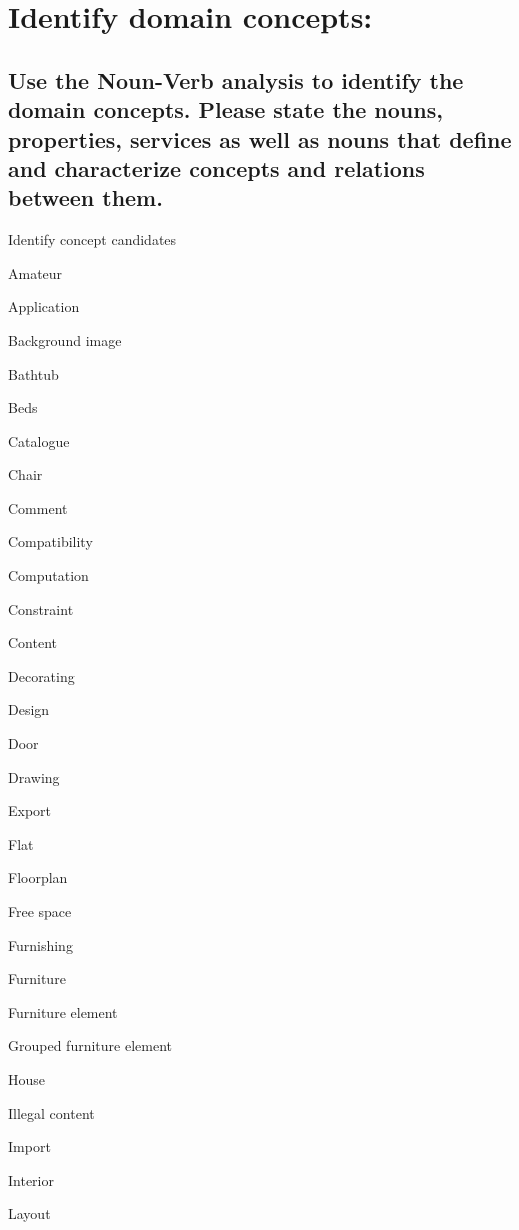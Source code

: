 \clearpage
	\section{Identify domain concepts:}
		\subsection{Use the Noun-Verb analysis to identify the domain concepts. Please state the
			nouns, properties, services as well as nouns that define and characterize
			concepts and relations between them.}
		
		\begin{paracol}{4}
			
			Identify concept candidates\\
			\begin{compactitem}
				\item Amateur
				\item Application
				\item Background image
				\item Bathtub
				\item Beds
				\item Catalogue
				\item Chair
				\item Comment
				\item Compatibility
				\item Computation
				\item Constraint
				\item Content
				\item Decorating
				\item Design
				\item Door
				\item Drawing
				\item Export
				\item Flat
				\item Floorplan
				\item Free space
				\item Furnishing
				\item Furniture
				\item Furniture element
				\item Grouped furniture element
				\item House
				\item Illegal content
				\item Import
				\item Interior
				\item Layout

\end{compactitem}
\end{paracol}
